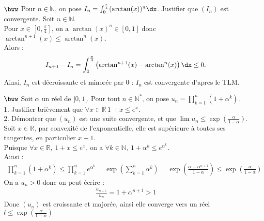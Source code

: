 \documentclass[11pt]{article}
\begin{document}
\begin{exercice}{$\bww$}{}
    Pour $n\in\mathbb{N}$, on pose $I_n = \int_0^{\frac{\pi}{4}}(\arctan(x))^n\dx$. Justifier que $(I_n)$ est convergente.
    \tcblower
    Soit $n\in\mathbb{N}$.\\
    Pour $x\in[0, \frac{\pi}{4}]$, on a $\arctan(x)^n \in [0,1]$ donc $\arctan^{n+1}(x) \leq \arctan^n(x)$.\\
    Alors :
    \begin{align*}
        I_{n+1} - I_n = \int_0^{\frac{\pi}{4}}\left( \arctan^{n+1}(x) - \arctan^n(x) \right)\dx \leq 0.
    \end{align*}
    Ainsi, $I_n$ est décroissante et minorée par 0 : $I_n$ est convergente d'apres le TLM.
\end{exercice}

\begin{exercice}{$\bww$}{}
    Soit $\alpha$ un réel de $]0,1[$. Pour tout $n\in\mathbb{N}^*$, on pose $u_n=\prod_{k=1}^n(1+\alpha^k)$.\\
    1. Justifier brièvement que $\forall x \in \mathbb{R} ~ 1 + x \leq e^x$.\\
    2. Démontrer que $(u_n)$ est une suite convergente, et que $\lim u_n \leq \exp(\frac{\alpha}{1-\alpha})$.
    \tcblower
     Soit $x\in\mathbb{R}$, par convexité de l'exponentielle, elle est supérieure à toutes ses tangentes, en particulier $x+1$.\\
     Puisque $\forall x\in\mathbb{R}, ~ 1 + x \leq e^x$, on a $\forall k\in\mathbb{N}, ~ 1 + \alpha^k \leq e^{\alpha^k}$.\\
    Ainsi :
    \begin{align*}
        \prod_{k=1}^n(1+\alpha^k) \leq \prod_{k=1}^ne^{\alpha^k}=\exp(\sum_{k=1}^n{\alpha^k})=\exp(\frac{\alpha-\alpha^{n+1}}{1-\alpha})\leq\exp\left( \frac{\alpha}{1-\alpha} \right)
    \end{align*}
    On a $u_n>0$ donc on peut écrire :
    \begin{align*}
        \frac{u_{n+1}}{u_n} = 1+\alpha^{n+1} > 1
    \end{align*}
    Donc $(u_n)$ est croissante et majorée, ainsi elle converge vers un réel $l \leq \exp(\frac{\alpha}{1-\alpha})$
\end{exercice}
\end{document}
